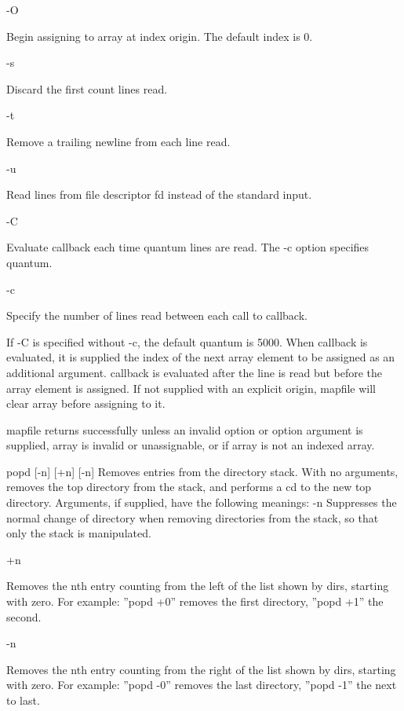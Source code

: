 {{-O

Begin assigning to array at index origin. The default index is 0.

-s

Discard the first count lines read.

-t

Remove a trailing newline from each line read.

-u

Read lines from file descriptor fd instead of the standard input.

-C

Evaluate callback each time quantum lines are read. The -c option specifies quantum.

-c

Specify the number of lines read between each call to callback.

If -C is specified without -c, the default quantum is 5000. When callback is evaluated, it is supplied the index of the next array element to be assigned as an additional argument. callback is evaluated after the line is read but before the array element is assigned.
If not supplied with an explicit origin, mapfile will clear array before assigning to it.

mapfile returns successfully unless an invalid option or option argument is supplied, array is invalid or unassignable, or if array is not an indexed array.

popd [-n] [+n] [-n]
Removes entries from the directory stack. With no arguments, removes the top directory from the stack, and performs a cd to the new top directory. Arguments, if supplied, have the following meanings:
-n
Suppresses the normal change of directory when removing directories from the stack, so that only the stack is manipulated.

+n

Removes the nth entry counting from the left of the list shown by dirs, starting with zero. For example: ''popd +0'' removes the first directory, ''popd +1'' the second.

-n

Removes the nth entry counting from the right of the list shown by dirs, starting with zero. For example: ''popd -0'' removes the last directory, ''popd -1'' the next to last.

}}
